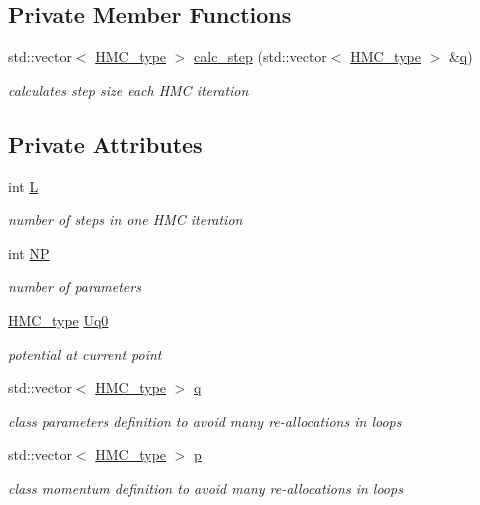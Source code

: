 \subsection*{Private Member Functions}
\begin{DoxyCompactItemize}
\item 
std\-::vector$<$ \hyperlink{define__type_8h_a9adf655d34223b34db3baff5c7ce420c}{H\-M\-C\-\_\-type} $>$ \hyperlink{class_h_m_c__base_a78e3fc2958f28c03b0af2dae57bb1902}{calc\-\_\-step} (std\-::vector$<$ \hyperlink{define__type_8h_a9adf655d34223b34db3baff5c7ce420c}{H\-M\-C\-\_\-type} $>$ \&\hyperlink{class_h_m_c__base_a9cb5e5ac7774b066976e6e9cac0dbfe8}{q})
\begin{DoxyCompactList}\small\item\em calculates step size each H\-M\-C iteration \end{DoxyCompactList}\end{DoxyCompactItemize}
\subsection*{Private Attributes}
\begin{DoxyCompactItemize}
\item 
int \hyperlink{class_h_m_c__base_a784a93d47df670ad254249233b6d81a1}{L}
\begin{DoxyCompactList}\small\item\em number of steps in one H\-M\-C iteration \end{DoxyCompactList}\item 
int \hyperlink{class_h_m_c__base_a204db698729d8f3ac18cbe8ce6257440}{N\-P}
\begin{DoxyCompactList}\small\item\em number of parameters \end{DoxyCompactList}\item 
\hyperlink{define__type_8h_a9adf655d34223b34db3baff5c7ce420c}{H\-M\-C\-\_\-type} \hyperlink{class_h_m_c__base_af1b25a6ca516eebc2385c6359daeff32}{Uq0}
\begin{DoxyCompactList}\small\item\em potential at current point \end{DoxyCompactList}\item 
std\-::vector$<$ \hyperlink{define__type_8h_a9adf655d34223b34db3baff5c7ce420c}{H\-M\-C\-\_\-type} $>$ \hyperlink{class_h_m_c__base_a9cb5e5ac7774b066976e6e9cac0dbfe8}{q}
\begin{DoxyCompactList}\small\item\em class parameters definition to avoid many re-\/allocations in loops \end{DoxyCompactList}\item 
std\-::vector$<$ \hyperlink{define__type_8h_a9adf655d34223b34db3baff5c7ce420c}{H\-M\-C\-\_\-type} $>$ \hyperlink{class_h_m_c__base_a138936eeaf2656aa5f2d51395c8e68f5}{p}
\begin{DoxyCompactList}\small\item\em class momentum definition to avoid many re-\/allocations in loops \end{DoxyCompactList}\end{DoxyCompactItemize}


